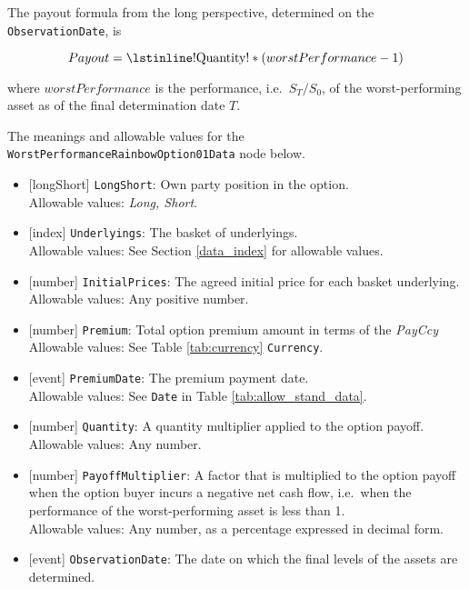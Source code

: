 The payout formula from the long perspective, determined on the \lstinline!ObservationDate!, is

\begin{equation*}
  Payout = \text{\lstinline!Quantity!} * (worstPerformance - 1)
\end{equation*}

where $worstPerformance$ is the performance, i.e.\ $S_T/S_0$, of the worst-performing asset as of the
final determination date $T$.

The meanings and allowable values for the \lstinline!WorstPerformanceRainbowOption01Data! node below.

\begin{itemize} 
  \item{}[longShort] \lstinline!LongShort!: Own party position in the option. \\
  Allowable values: \emph{Long, Short}.
  \item{}[index] \lstinline!Underlyings!: The basket of underlyings. \\
  Allowable values: See Section \ref{data_index} for allowable values.
  \item{}[number] \lstinline!InitialPrices!: The agreed initial price for each basket underlying. \\
  Allowable values: Any positive number.
  \item{}[number] \lstinline!Premium!: Total option premium amount in terms of the \emph{PayCcy} \\
  Allowable values: See Table \ref{tab:currency} \lstinline!Currency!.
  \item{}[event] \lstinline!PremiumDate!: The premium payment date. \\
  Allowable values: See \lstinline!Date! in Table \ref{tab:allow_stand_data}.
  \item{}[number] \lstinline!Quantity!: A quantity multiplier applied to the option payoff. \\
  Allowable values: Any number.
  \item{}[number] \lstinline!PayoffMultiplier!: A factor that is multiplied to the option payoff when the option buyer incurs a negative net cash flow, i.e.\ when the performance of the worst-performing asset is less than 1. \\
  Allowable values: Any number, as a percentage expressed in decimal form.
  \item{}[event] \lstinline!ObservationDate!: The date on which the final levels of the assets are determined. \\

\end{itemize}
